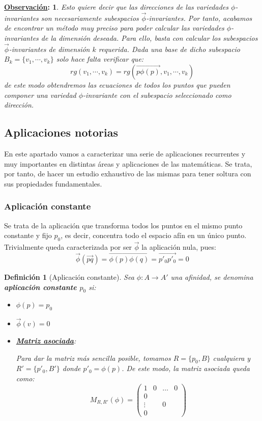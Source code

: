 \documentclass[10pt,a4paper,openright]{book}
\theoremstyle{break}
\newtheorem*{defi}{Definición}
\newtheorem*{obs}{\underline{Observación}:}
\begin{document}
\begin{obs}
Esto quiere decir que las direcciones de las variedades $\phi$-invariantes son necesariamente subespacios $\vec{\phi}$-invariantes. Por tanto, acabamos de encontrar un método muy preciso para poder calcular las variedades $\phi$-invariantes de la dimensión deseada. Para ello, basta con calcular los subespacios $\vec{\phi}$-invariantes de dimensión $k$ requerida. Dada una base de dicho subespacio $B_k=\{v_1, \cdots, v_k\}$ solo hace falta verificar que:
$$rg\left(v_1, \cdots, v_k\right) = rg\left(\overrightarrow{p\phi(p)}, v_1, \cdots, v_k\right)$$
de este modo obtendremos las ecuaciones de todos los puntos que pueden componer una variedad $\phi$-invariante con el subespacio seleccionado como dirección.
\end{obs}


\subsection{Aplicaciones notorias}
En este apartado vamos a caracterizar una serie de aplicaciones recurrentes y muy importantes en distintas áreas y aplicaciones de las matemáticas. Se trata, por tanto, de hacer un estudio exhaustivo de las mismas para tener soltura con sus propiedades fundamentales.

\subsubsection{Aplicación constante}
Se trata de la aplicación que transforma todos los puntos en el mismo punto constante y fijo $p_0$, es decir, concentra todo el espacio afín en un único punto. Trivialmente queda caracterizada por ser $\vec{\phi}$ la aplicación nula, pues:
$$\vec{\phi}(\vec{pq}) = \overrightarrow{\phi(p)\phi(q)} = \vec{p'_0 p'_0} = 0$$
\begin{defi}[Aplicación constante]
Sea $\phi: A\rightarrow A'$ una afinidad, se denomina \textbf{aplicación constante $p_0$} si: 
\begin{itemize}
\item $\phi(p) = p_0$
\item $\vec{\phi}(v) = 0$
\item \underline{\textbf{Matriz asociada}}:

Para dar la matriz más sencilla posible, tomamos $R = \{p_0, B\}$ cualquiera y $R' = \{p'_0, B'\}$ donde $p'_0 = \phi (p)$. De este modo, la matriz asociada queda como:
$$M_{R, R'} (\phi) = \left(\begin{array}{c|ccc}
1  & 0 & \ldots & 0 \\
\hline
0  &  & & \\
\vdots &  & 0 & \\
0 & & &
\end{array}
\right)$$
\end{itemize}
\end{defi}
\end{document}
